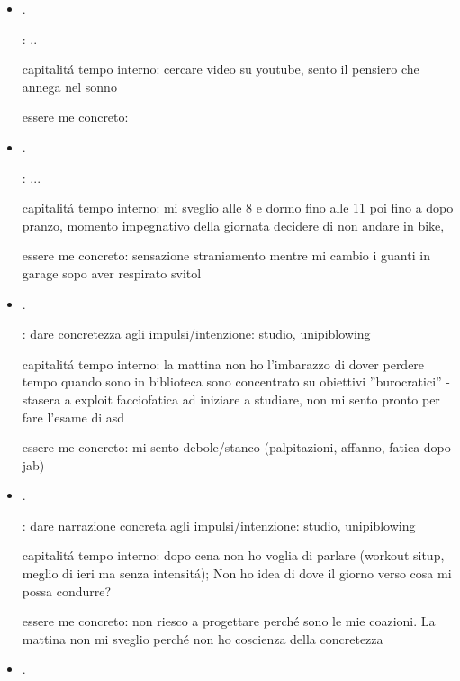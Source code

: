 \begin{itemize}
: .

capitalit\'a tempo interno: 

essere me concreto:

\item {}.

: ..

capitalit\'a tempo interno: cercare video su youtube, sento il pensiero che annega nel sonno

essere me concreto:

\item {}.

: ...

capitalit\'a tempo interno: mi sveglio alle 8 e dormo fino alle 11 poi fino a dopo pranzo, momento impegnativo della giornata decidere di non andare in bike, 

essere me concreto: sensazione straniamento mentre mi cambio i guanti in garage sopo aver respirato svitol

\item {}.

: dare concretezza agli impulsi/intenzione: studio, unipiblowing

capitalit\'a tempo interno: la mattina non ho l'imbarazzo di dover perdere tempo quando sono in biblioteca sono concentrato su obiettivi ''burocratici'' - stasera a exploit facciofatica ad iniziare a studiare, non mi sento pronto per fare l'esame di asd

essere me concreto: mi sento debole/stanco (palpitazioni, affanno, fatica dopo jab)

\item {}.

: dare narrazione concreta agli impulsi/intenzione: studio, unipiblowing

capitalit\'a tempo interno: dopo cena non ho voglia di parlare (workout situp, meglio di ieri ma senza intensit\'a); Non ho idea di dove il giorno verso cosa mi possa condurre? 

essere me concreto: non riesco a progettare perch\'e sono le mie coazioni. La mattina non mi sveglio perch\'e non ho coscienza della concretezza

\item {}.


\end{itemize}
